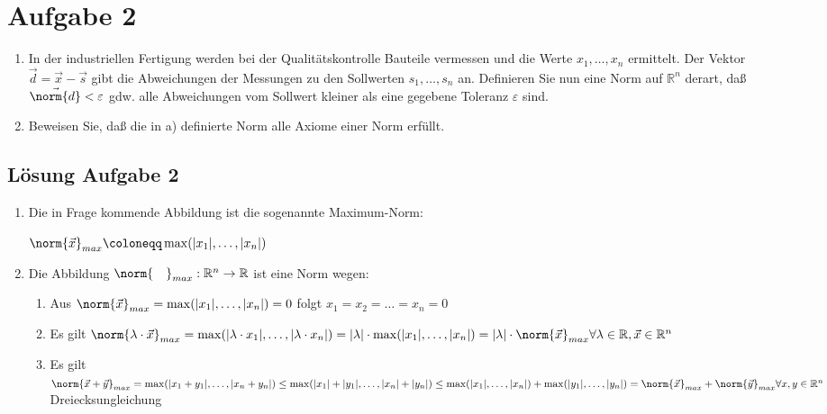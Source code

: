 \documentclass[ngerman, a4paper]{scrartcl}
\begin{document}
	\section*{Aufgabe 2}
	\begin{samepage}
	\begin{enumerate}[\textbf{\alph*)}]
		\item In der industriellen Fertigung werden bei der Qualitätskontrolle Bauteile vermessen und die Werte $ x_1, \ldots, x_n $ ermittelt. Der Vektor $\vec{d} = \vec{x} - \vec{s}$ gibt die Abweichungen der Messungen zu den Sollwerten $s_1, \ldots, s_n$ an. Definieren Sie nun eine Norm auf $\mathbb{R}^n$ derart, daß $\vec{\norm{d}} < \varepsilon$ gdw. alle Abweichungen vom Sollwert kleiner als eine gegebene Toleranz $\varepsilon$ sind.
		\item Beweisen Sie, daß die in a) definierte Norm alle Axiome einer Norm erfüllt.
	\end{enumerate}	
	\end{samepage}
	
	\subsection*{Lösung Aufgabe 2}
	
	\begin{enumerate}[\textbf{\alph*)}]
		\item Die in Frage kommende Abbildung ist die sogenannte Maximum-Norm:
		
		$\norm{\vec{x}}_{max} \coloneqq \max(|x_1|, \dots, |x_n|)$
		\item Die Abbildung $\norm{\quad}_{max}: \mathbb{R}^n \rightarrow \mathbb{R}$ ist eine Norm wegen:
		\begin{enumerate}[\arabic*.]
			\item Aus $\norm{\vec{x}}_{max} = \max(|x_1|, \dots, |x_n|) = 0$ folgt $x_1 = x_2 = \ldots = x_n = 0$
			\item Es gilt $\norm{\lambda \cdot \vec{x}}_{max} = \max(|\lambda \cdot x_1|, \dots, |\lambda \cdot x_n|) = |\lambda| \cdot \max(|x_1|, \dots, |x_n|) = |\lambda| \cdot \norm{\vec{x}}_{max} \forall \lambda \in \mathbb{R}, \vec{x} \in \mathbb{R}^n$ 
			\item Es gilt $\norm{\vec{x} + \vec{y}}_{max} = \max(|x_1 + y_1|, \ldots, |x_n + y_n|) \le \max(|x_1| + |y_1|, \ldots, |x_n| + |y_n|) \le \max(|x_1|, \ldots, |x_n|) + \max(|y_1|, \ldots, |y_n|) = \norm{\vec{x}}_{max} + \norm{\vec{y}}_{max} \forall x, y \in \mathbb{R}^n$ Dreiecksungleichung
		\end{enumerate}
	\end{enumerate}
	
\end{document}
